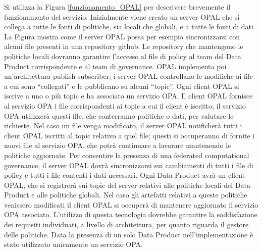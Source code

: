 \documentclass[12pt]{report}
\begin{document}
Si utilizza la Figura \ref{funzionamento_OPAL} per descrivere brevemente il funzionamento del servizio.
Inizialmente viene creato un server OPAL che si collega a tutte le fonti di politiche, sia locali che globali, e a tutte le fonti di dati.
La Figura mostra come il server OPAL possa per esempio sincronizzarsi con alcuni file presenti in una repository github.
Le repository che mantengono le politiche locali dovranno garantire l'accesso al file di policy al team del Data Product corrispondente e al team di governance.
OPAL implementa poi un'architettura publish-subscriber;
i server OPAL controllano le modifiche ai file a cui sono ``collegati'' e le pubblicano su alcuni ``topic''.
Ogni client OPAL si iscrive a uno o più topic e ha associato un servizio OPA.
Il client OPAL fornisce al servizio OPA i file corrispondenti ai topic a cui il client è iscritto; il servizio OPA utilizzerà questi file, che conterranno politiche o dati, per valutare le richieste.
Nel caso un file venga modificato, il server OPAL notificherà tutti i client OPAL iscritti al topic relativo a quel file; questi si occuperanno di fornite i nuovi file al servizio OPA, che potrà continuare a lavorare mantenendo le politiche aggiornate.
Per consentire la presenza di una federated computational governance, il server OPAL dovrà sincronizzarsi sui cambiamenti di tutti i file di policy e tutti i file contenti i dati necessari.
Ogni Data Product avrà un client OPAL, che si registrerà sui topic del server relativi alle politiche locali del Data Product e alle politiche globali.
Nel caso gli artefatti relativi a queste politiche venissero modificati il client OPAL si occuperà di mantenere aggiornato il servizio OPA associato.
L'utilizzo di questa tecnologia dovrebbe garantire la soddisfazione dei requisiti individuati, a livello di architettura, per quanto riguarda il gestore delle politiche.
Data la presenza di un solo Data Product nell'implementazione è stato utilizzato unicamente un servizio OPA.
\end{document}
